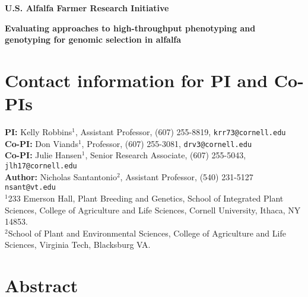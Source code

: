 \documentclass[12pt, letterpaper]{article}
\author{Nicholas Santantonio}
\date{\today}
\begin{document}
\begin{center}
\large{\textbf{U.S. Alfalfa Farmer Research Initiative}}
\end{center}


\begin{center}
\Large{\textbf{Evaluating approaches to high-throughput phenotyping and genotyping for genomic selection in alfalfa}}
\end{center}



\section*{Contact information for PI and Co-PIs}
	
\noindent \textbf{PI:} Kelly Robbins$^1$, Assistant Professor, (607) 255-8819, \texttt{krr73@cornell.edu}\\
\noindent \textbf{Co-PI:} Don Viands$^1$, Professor, (607) 255-3081, \texttt{drv3@cornell.edu}\\
\noindent \textbf{Co-PI:} Julie Hansen$^1$, Senior Research Associate, (607) 255-5043, \texttt{jlh17@cornell.edu}\\
\noindent \textbf{Author:} Nicholas Santantonio$^2$, Assistant Professor, (540) 231-5127 \texttt{nsant@vt.edu} \\
$^1$233 Emerson Hall, Plant Breeding and Genetics, School of Integrated Plant Sciences, College of Agriculture and Life Sciences, Cornell University, Ithaca, NY 14853.\\
\noindent $^2$School of Plant and Environmental Sciences, College of Agriculture and Life Sciences, Virginia Tech, Blacksburg VA.




\section{Abstract}
\end{document}
